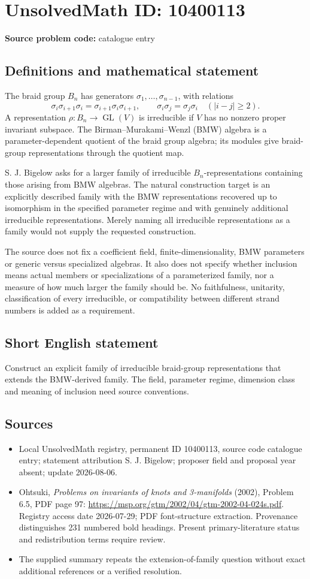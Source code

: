 \documentclass[11pt]{article}
\begin{document}
\section*{UnsolvedMath ID: 10400113}
\textbf{Source problem code:} catalogue entry
\subsection{Definitions and mathematical statement}
The braid group \(B_n\) has generators \(\sigma_1,\ldots,\sigma_{n-1}\), with relations
\[
 \sigma_i\sigma_{i+1}\sigma_i=\sigma_{i+1}\sigma_i\sigma_{i+1},\qquad
 \sigma_i\sigma_j=\sigma_j\sigma_i\quad(|i-j|\geq2).
\]
A representation \(\rho:B_n\to\operatorname{GL}(V)\) is irreducible if \(V\) has no nonzero proper invariant subspace. The Birman--Murakami--Wenzl (BMW) algebra is a parameter-dependent quotient of the braid group algebra; its modules give braid-group representations through the quotient map.

S. J. Bigelow asks for a larger family of irreducible \(B_n\)-representations containing those arising from BMW algebras. The natural construction target is an explicitly described family with the BMW representations recovered up to isomorphism in the specified parameter regime and with genuinely additional irreducible representations. Merely naming all irreducible representations as a family would not supply the requested construction.

The source does not fix a coefficient field, finite-dimensionality, BMW parameters or generic versus specialized algebras. It also does not specify whether inclusion means actual members or specializations of a parameterized family, nor a measure of how much larger the family should be. No faithfulness, unitarity, classification of every irreducible, or compatibility between different strand numbers is added as a requirement.
\subsection{Short English statement}
Construct an explicit family of irreducible braid-group representations that extends the BMW-derived family. The field, parameter regime, dimension class and meaning of inclusion need source conventions.
\subsection{Sources}
\begin{itemize}
\item Local UnsolvedMath registry, permanent ID 10400113, source code catalogue entry; statement attribution S. J. Bigelow; proposer field and proposal year absent; update 2026-08-06.
\item Ohtsuki, \emph{Problems on invariants of knots and 3-manifolds} (2002), Problem 6.5, PDF page 97: \url{https://msp.org/gtm/2002/04/gtm-2002-04-024s.pdf}. Registry access date 2026-07-29; PDF font-structure extraction. Provenance distinguishes 231 numbered bold headings. Present primary-literature status and redistribution terms require review.
\item The supplied summary repeats the extension-of-family question without exact additional references or a verified resolution.
\end{itemize}
\end{document}
